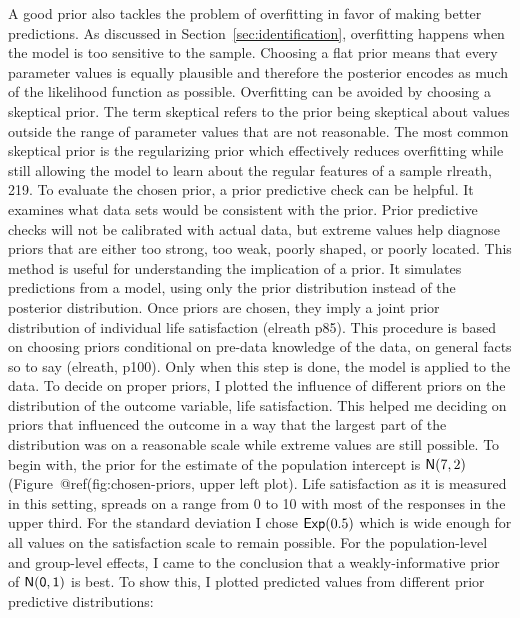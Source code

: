 \documentclass[a4, 12pt]{article}
\begin{document}
A good prior also tackles the problem of overfitting in favor of making better predictions. As discussed in Section~\ref{sec:identification}, overfitting happens when the model is too sensitive to the sample. Choosing a flat prior means that every parameter values is equally plausible and therefore the posterior encodes as much of the likelihood function as possible. Overfitting can be avoided by choosing a skeptical prior. The term skeptical refers to the prior being skeptical about values outside the range of parameter values that are not reasonable. The most common skeptical prior is the regularizing prior which effectively reduces overfitting while still allowing the model to learn about the regular features of a sample rlreath, 219.
To evaluate the chosen prior, a prior predictive check can be helpful. It examines what data sets would be consistent with the prior. Prior predictive checks will not be calibrated with actual data, but extreme values help diagnose priors that are either too strong, too weak, poorly shaped, or poorly located. This method is useful for understanding the implication of a prior. It simulates predictions from a model, using only the prior distribution instead of the posterior distribution. Once priors are chosen, they imply a joint prior distribution of individual life satisfaction (elreath p85). This procedure is based on choosing priors conditional on pre-data knowledge of the data, on general facts so to say (elreath, p100). Only when this step is done, the model is applied to the data.
To decide on proper priors, I plotted the influence of different priors on the distribution of the outcome variable, life satisfaction. This helped me deciding on priors that influenced the outcome in a way that the largest part of the distribution was on a reasonable scale while extreme values are still possible. To begin with, the prior for the estimate of the population intercept is \({\sf N}(7,2)\) (Figure~@ref(fig:chosen-priors, upper left plot). Life satisfaction as it is measured in this setting, spreads on a range from 0 to 10 with most of the responses in the upper third. For the standard deviation I chose \({\sf Exp}(0.5)\) which is wide enough for all values on the satisfaction scale to remain possible. For the population-level and group-level effects, I came to the conclusion that a weakly-informative prior of \(\sf {N}(0,1)\) is best. To show this, I plotted predicted values from different prior predictive distributions:
\end{document}
